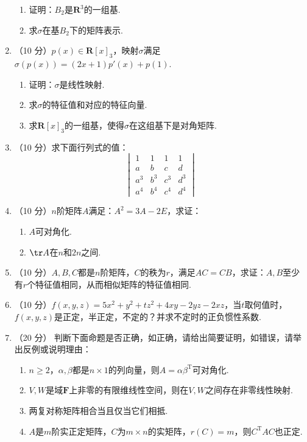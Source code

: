 \begin{enumerate}
\begin{enumerate}
        \item 证明：\(B_2\)是\(\mathbf{R}^3\)的一组基.

        \item 求\(\sigma\)在基\(B_2\)下的矩阵表示.
    \end{enumerate}

    \item （10 分）\(p(x)\in\mathbf{R}[x]_3\)，映射\(\sigma\)满足\(\sigma(p(x))=(2x+1)p'(x)+p(1)\).
    \begin{enumerate}
        \item 证明：\(\sigma\)是线性映射.

        \item 求\(\sigma\)的特征值和对应的特征向量.

        \item 求\(\mathbf{R}[x]_3\)的一组基，使得\(\sigma\)在这组基下是对角矩阵.
    \end{enumerate}

    \item （10 分）求下面行列式的值：
    \[ \begin{vmatrix}
        1 & 1 & 1 & 1 \\
        a & b & c & d \\
        a^3 & b^3 & c^3 & d^3 \\
        a^4 & b^4 & c^4 & d^4
    \end{vmatrix} \]

    \item （10 分）\(n\)阶矩阵\(A\)满足：\(A^2=3A-2E\)，求证：
    \begin{enumerate}
        \item \(A\)可对角化.

        \item \(\tr A\)在\(n\)和\(2n\)之间.
    \end{enumerate}

    \item （10 分）\(A,B,C\)都是\(n\)阶矩阵，\(C\)的秩为\(r\)，满足\(AC=CB\)，求证：\(A,B\)至少有\(r\)个特征值相同，从而相似矩阵的特征值相同.

    \item （10 分）\(f(x,y,z)=5x^2+y^2+tz^2+4xy-2yz-2xz\)，当\(t\)取何值时，\(f(x,y,z)\)是正定，半正定，不定的？并求不定时的正负惯性系数.

    \item （20 分）
    判断下面命题是否正确，如正确，请给出简要证明，如错误，请举出反例或说明理由：
    \begin{enumerate}
        \item \(n\geqslant 2\)，\(\alpha,\beta\)都是\(n\times1\)的列向量，则\(A=\alpha\beta^\mathrm{T}\)可对角化.

        \item \(V,W\)是域\(\mathbf{F}\)上非零的有限维线性空间，则在\(V,W\)之间存在非零线性映射.

        \item 两复对称矩阵相合当且仅当它们相抵.

        \item \(A\)是\(m\)阶实正定矩阵，\(C\)为\(m\times n\)的实矩阵，\(r(C)=m\)，则\(C^\mathrm{T}AC\)也正定.
    \end{enumerate}
\end{enumerate}
